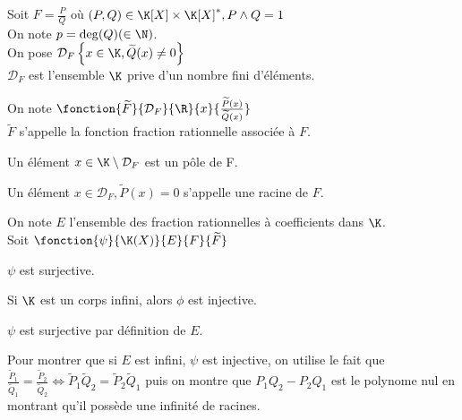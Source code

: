 \documentclass[12pt,twoside,a4paper]{article}
\author{MPSI 2}
\begin{document}
	\maketitle
	Soit $F=\frac PQ$ o\`u $(P,Q)\in\K[X]\times\K[X]^*,P\wedge Q=1$ \\
	On note $p=\deg(Q)(\in\N)$. \\
	On pose $\mathcal{D}_F\left\{x\in\K,\widetilde Q(x)\neq0\right\}$ \\
	$\mathcal D_F$ est l'ensemble $\K$ prive d'un nombre fini d'\'el\'ements.
	\begin{defi}
		\begin{liste}
			\item On note $\fonction{\widetilde{F}}{\mathcal{D}_F}{\R}{x}{\frac{\widetilde{P}(x)}{\widetilde{Q}(x)}}$ \\
				$\widetilde F$ s'appelle la fonction fraction rationnelle associ\'ee \`a $F$.
			\item Un \'el\'ement $x\in\K\setminus\mathcal D_F$ est un p\^ole de F.
			\item Un \'el\'ement $x\in\mathcal D_F,\widetilde P(x)=0$ s'appelle une racine de $F$.
		\end{liste}
	\end{defi}
	\begin{prop}
		On note $E$ l'ensemble des fraction rationnelles \`a coefficients dans $\K$. \\
		Soit $\fonction{\psi}{\K(X)}{E}{F}{\widetilde F}$
		\begin{liste}
			\item $\psi$ est surjective.
			\item Si $\K$ est un corps infini, alors $\phi$ est injective.
		\end{liste}
	\end{prop}
	\begin{preuve}
		\begin{liste}
			\item $\psi$ est surjective par d\'efinition de $E$.
			\item Pour montrer que si $E$ est infini, $\psi$ est injective, on utilise le fait que $\frac{\widetilde P_1}{\widetilde Q_1}=\frac{\widetilde P_2}{\widetilde Q_2}\iff\widetilde P_1\widetilde Q_2=\widetilde P_2\widetilde Q_1$ puis on montre que $P_1Q_2-P_2Q_1$ est le polynome nul en montrant qu'il poss\`ede une infinit\'e de racines.
		\end{liste}
	\end{preuve}
\end{document}
